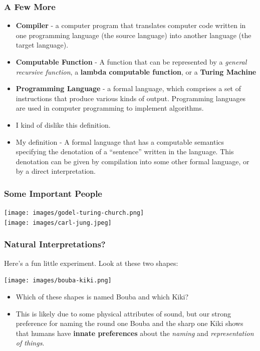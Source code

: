 \documentclass{beamer}
\begin{document}
\begin{frame}
  \frametitle{A Few More}
  \begin{itemize}
  \item \textbf{Compiler} - a computer program that translates computer code written in one programming language (the source language) into another language (the target language).
  \item<2-> \textbf{Computable Function} - A function that can be represented by a \emph{general recursive function}, a \textbf{lambda computable function}, or
    a \textbf{Turing Machine}
  \item<3-> \textbf{Programming Language} - a formal language, which comprises a set of instructions that produce various kinds of output. Programming languages are used in computer programming to implement algorithms.
  \item<4->  I kind of dislike this definition.
  \item<5-> My definition - A formal language that has a computable semantics specifying the denotation of a ``sentence'' written in the language. This denotation  can be given by compilation into some other formal language, or by a direct interpretation.
  \end{itemize}
\end{frame}

\begin{frame}
  \frametitle{Some Important People}
  \begin{center}
    \texttt{[image: images/godel-turing-church.png]}\\
    \pause
    \texttt{[image: images/carl-jung.jpeg]}
  \end{center}
\end{frame}

\begin{frame}
  \frametitle{Natural Interpretations?}
  Here's a fun little experiment. Look at these two shapes:
  \begin{center}
    \texttt{[image: images/bouba-kiki.png]}
  \end{center}
  \begin{itemize}
  \item<2-> Which of these shapes is named Bouba and which Kiki?
  \item<3-> This is likely due to some physical attributes of sound, but
    our strong preference for naming the round one Bouba and the
    sharp one Kiki shows that humans have \textbf{innate preferences}
    about the \emph{naming} and \emph{representation of things}.
  \end{itemize}
\end{frame}
\end{document}
